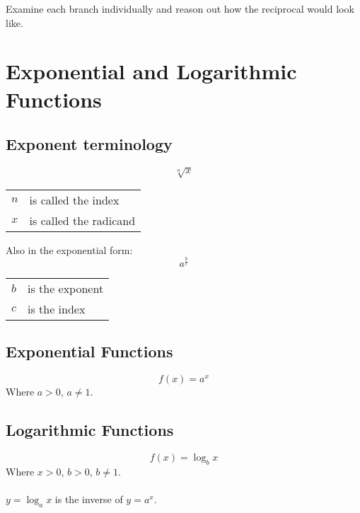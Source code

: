 \documentclass{article}
\numberwithin{equation}{section}
\begin{document}
Examine each branch individually and reason out how the reciprocal would look like.

\section{Exponential and Logarithmic Functions}
\subsection*{Exponent terminology}
\begin{equation*}
	\sqrt[n]{x}
\end{equation*}
\begin{samepage}
\begin{center}
\begin{tabular}{l l}
	$n$ & is called the index \\
	$x$ & is called the radicand \\
\end{tabular}
\end{center}
\end{samepage}
\begin{samepage}
Also in the exponential form:
\begin{equation*}
	a^{\textstyle\frac{b}{c}}
\end{equation*}
\begin{center}
\begin{tabular}{l l}
	$b$ & is the exponent \\
	$c$ & is the index \\
\end{tabular}
\end{center}
\end{samepage}

\subsection{Exponential Functions}
\begin{equation*}
	f(x) = a^x
\end{equation*}
Where $a > 0$, $a \ne 1$.
\subsection{Logarithmic Functions}
\begin{equation*}
	f(x) = \log_b x
\end{equation*}
Where $x > 0$, $b > 0$, $b \ne 1$.
\\ \\
$y = \log_a x$ is the inverse of $y = a^x$.
\end{document}
